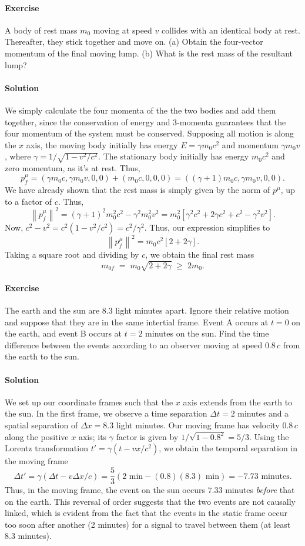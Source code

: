 \documentclass[10pt]{article}
\newcommand\norm[1]{\left\lVert#1\right\rVert}
\newcounter{prob}
\def\problem{\stepcounter{prob}\paragraph{Exercise \arabic{prob}}}
\def\solution{\paragraph{Solution}}
\begin{document}
        \problem A body of rest mass $m_0$ moving at speed $v$ collides with an identical body at rest. Thereafter, they stick together
        and move on. (a) Obtain the four-vector momentum of the final moving lump. (b) What is the rest mass of the resultant lump?

        \solution We simply calculate the four momenta of the the two bodies and add them together, since the conservation 
        of energy and 3-momenta guarantees that the four momentum of the system must be conserved.
        Supposing all motion is along the $x$ axis, the moving body initially has energy $E = \gamma m_0c^2$ and momentum $\gamma m_0 v$,
        where $\gamma = 1 /\sqrt{1 - v^2 / c^2}$. The stationary body initially has energy $m_0c^2$ and zero momentum, as it's at rest.
        Thus,
        \[
                p_f^\mu = \left(\gamma m_0c, \gamma m_0v, 0, 0\right) + \left(m_0c, 0, 0, 0\right) = \left((\gamma + 1)m_0c, \gamma m_0v, 0, 0\right).
                        \tag{a}
        \]
        We have already shown that the rest mass is simply given by the norm of $p^\mu$, up to a factor of $c$. Thus,
        \[
                \norm{p_f^\mu}^2 = (\gamma + 1)^2m_0^2c^2 - \gamma^2m_0^2 v^2 = m_0^2\left[\gamma^2c^2 + 2\gamma c^2 + c^2 - \gamma^2v^2\right].
        \]
        Now, $c^2 - v^2 = c^2 (1 - v^2 /c^2) = c^2 /\gamma^2$. Thus, our expression simplifies to
        \[
                \norm{p_f^\mu}^2 = m_0c^2\left[2 + 2\gamma\right] .
        \]
        Taking a square root and dividing by $c$, we obtain the final rest mass
        \[
                m_{0f} \;=\; m_0\sqrt{2 + 2\gamma} \;\geq\; 2m_0. \tag{b}
        \]

        \problem The earth and the sun are 8.3 light minutes apart. Ignore their relative motion and suppose that they are in the same intertial frame.
        Event A occurs at $t = 0$ on the earth, and event B occurs at $t = 2$ minutes on the sun. Find the time difference between the events
        according to an observer moving at speed $0.8\,c$ from the earth to the sun.

        \solution We set up our coordinate frames such that the $x$ axis extends from the earth to the sun. In the first frame,
        we observe a time separation $\Delta t = 2$ minutes and a spatial separation of $\Delta x = 8.3$ light minutes.
        Our moving frame has velocity $0.8\,c$ along the positive $x$ axis; its $\gamma$ factor is given by $1 /\sqrt{1 - 0.8^2} = 5 /3$.
        Using the Lorentz transformation $t' = \gamma(t - vx /c^2)$, we obtain the temporal separation in the moving frame
        \[
                \Delta t' = \gamma(\Delta t - v\Delta x /c) = \frac{5}{3} \left(2\text{ min} - (0.8)(8.3)\text{ min}\right) = -7.73\text{ minutes}.
        \]
        Thus, in the moving frame, the event on the sun occurs $7.33$ minutes \textit{before} that on the earth.
        This reversal of order suggests that the two events are not causally linked, which is evident from the fact that
        the events in the static frame occur too soon after another (2 minutes) for a signal to travel between them (at least 8.3 minutes).
\end{document}
